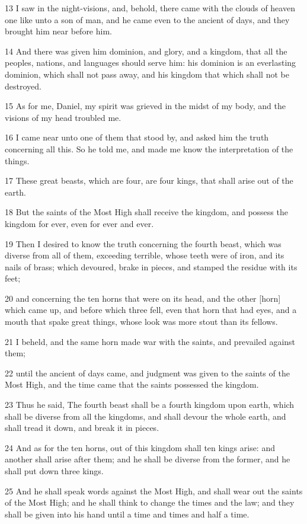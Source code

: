 \par 13 I saw in the night-visions, and, behold, there came with the clouds of heaven one like unto a son of man, and he came even to the ancient of days, and they brought him near before him.
\par 14 And there was given him dominion, and glory, and a kingdom, that all the peoples, nations, and languages should serve him: his dominion is an everlasting dominion, which shall not pass away, and his kingdom that which shall not be destroyed.
\par 15 As for me, Daniel, my spirit was grieved in the midst of my body, and the visions of my head troubled me.
\par 16 I came near unto one of them that stood by, and asked him the truth concerning all this. So he told me, and made me know the interpretation of the things.
\par 17 These great beasts, which are four, are four kings, that shall arise out of the earth.
\par 18 But the saints of the Most High shall receive the kingdom, and possess the kingdom for ever, even for ever and ever.
\par 19 Then I desired to know the truth concerning the fourth beast, which was diverse from all of them, exceeding terrible, whose teeth were of iron, and its nails of brass; which devoured, brake in pieces, and stamped the residue with its feet;
\par 20 and concerning the ten horns that were on its head, and the other [horn] which came up, and before which three fell, even that horn that had eyes, and a mouth that spake great things, whose look was more stout than its fellows.
\par 21 I beheld, and the same horn made war with the saints, and prevailed against them;
\par 22 until the ancient of days came, and judgment was given to the saints of the Most High, and the time came that the saints possessed the kingdom.
\par 23 Thus he said, The fourth beast shall be a fourth kingdom upon earth, which shall be diverse from all the kingdoms, and shall devour the whole earth, and shall tread it down, and break it in pieces.
\par 24 And as for the ten horns, out of this kingdom shall ten kings arise: and another shall arise after them; and he shall be diverse from the former, and he shall put down three kings.
\par 25 And he shall speak words against the Most High, and shall wear out the saints of the Most High; and he shall think to change the times and the law; and they shall be given into his hand until a time and times and half a time.
